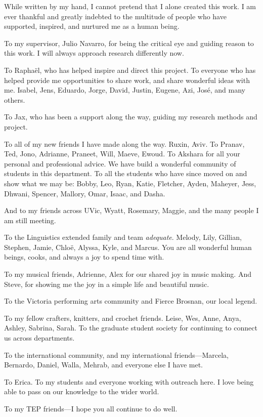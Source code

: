 While written by my hand, I cannot pretend that I alone created this
work. I am ever thankful and greatly indebted to the multitude of people
who have supported, inspired, and nurtured me as a human being.

To my supervisor, Julio Navarro, for being the critical eye and guiding
reason to this work. I will always approach research differently now.

To Raphaël, who has helped inspire and direct this project. To everyone
who has helped provide me opportunities to share work, and share
wonderful ideas with me. Isabel, Jens, Eduardo, Jorge, David, Justin,
Eugene, Azi, José, and many others.

To Jax, who has been a support along the way, guiding my research
methods and project.

To all of my new friends I have made along the way. Ruxin, Aviv. To
Pranav, Ted, Jono, Adrianne, Praneet, Will, Maeve, Ewoud. To Akshara for
all your personal and professional advice. We have build a wonderful
community of students in this department. To all the students who have
since moved on and show what we may be: Bobby, Leo, Ryan, Katie,
Fletcher, Ayden, Maheyer, Jess, Dhwani, Spencer, Mallory, Omar, Isaac,
and Dasha.

And to my friends across UVic, Wyatt, Rosemary, Maggie, and the many
people I am still meeting.

To the Linguistics extended family and team \emph{adequate}. Melody,
Lily, Gillian, Stephen, Jamie, Chloë, Alyssa, Kyle, and Marcus. You are
all wonderful human beings, cooks, and always a joy to spend time with.

To my musical friends, Adrienne, Alex for our shared joy in music
making. And Steve, for showing me the joy in a simple life and beautiful
music.

To the Victoria performing arts community and Fierce Brosnan, our local
legend.

To my fellow crafters, knitters, and crochet friends. Leise, Wes, Anne,
Anya, Ashley, Sabrina, Sarah. To the graduate student society for
continuing to connect us across departments.

To the international community, and my international friends---Marcela,
Bernardo, Daniel, Walla, Mehrab, and everyone else I have met.

To Erica. To my students and everyone working with outreach here. I love
being able to pass on our knowledge to the wider world.

To my TEP friends---I hope you all continue to do well.


